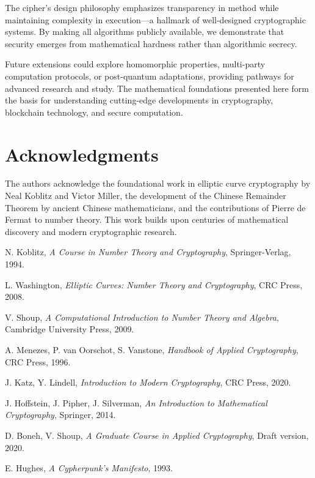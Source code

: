 \documentclass[12pt,a4paper]{article}
\begin{document}
The cipher's design philosophy emphasizes transparency in method while maintaining complexity in execution—a hallmark of well-designed cryptographic systems. By making all algorithms publicly available, we demonstrate that security emerges from mathematical hardness rather than algorithmic secrecy.

Future extensions could explore homomorphic properties, multi-party computation protocols, or post-quantum adaptations, providing pathways for advanced research and study. The mathematical foundations presented here form the basis for understanding cutting-edge developments in cryptography, blockchain technology, and secure computation.

\section*{Acknowledgments}

The authors acknowledge the foundational work in elliptic curve cryptography by Neal Koblitz and Victor Miller, the development of the Chinese Remainder Theorem by ancient Chinese mathematicians, and the contributions of Pierre de Fermat to number theory. This work builds upon centuries of mathematical discovery and modern cryptographic research.

\begin{thebibliography}{99}

N. Koblitz, \textit{A Course in Number Theory and Cryptography}, Springer-Verlag, 1994.

L. Washington, \textit{Elliptic Curves: Number Theory and Cryptography}, CRC Press, 2008.

V. Shoup, \textit{A Computational Introduction to Number Theory and Algebra}, Cambridge University Press, 2009.

A. Menezes, P. van Oorschot, S. Vanstone, \textit{Handbook of Applied Cryptography}, CRC Press, 1996.

J. Katz, Y. Lindell, \textit{Introduction to Modern Cryptography}, CRC Press, 2020.

J. Hoffstein, J. Pipher, J. Silverman, \textit{An Introduction to Mathematical Cryptography}, Springer, 2014.

D. Boneh, V. Shoup, \textit{A Graduate Course in Applied Cryptography}, Draft version, 2020.

E. Hughes, \textit{A Cypherpunk's Manifesto}, 1993.

\end{thebibliography}
\end{document}

